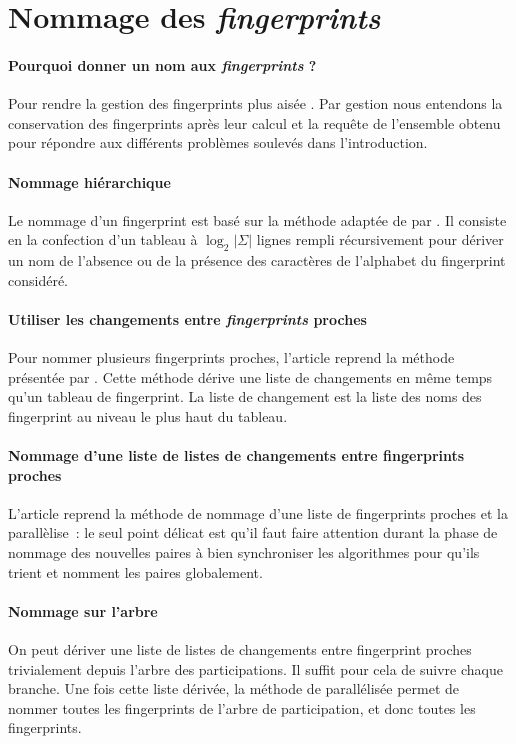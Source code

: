 \documentclass[a4paper]{article}
\begin{document}
\section{Nommage des \emph{fingerprints}}

\paragraph{Pourquoi donner un nom aux \emph{fingerprints} ?} Pour
rendre la gestion des fingerprints plus aisée \cite{amir}. Par
gestion nous entendons la conservation des fingerprints après leur
calcul et la requête de l'ensemble obtenu pour répondre aux différents
problèmes soulevés dans l'introduction.

\paragraph{Nommage hiérarchique} Le nommage d'un fingerprint est basé
sur la méthode adaptée de \cite{karp} par \cite{amir}. Il consiste en
la confection d'un tableau à $\log_2 |\Sigma|$ lignes rempli
récursivement pour dériver un nom de l'absence ou de la présence des
caractères de l'alphabet du fingerprint considéré.

\paragraph{Utiliser les changements entre \emph{fingerprints} proches}
Pour nommer plusieurs fingerprints proches, l'article reprend la
méthode présentée par \cite{tsur}. Cette méthode dérive une liste de
changements en même temps qu'un tableau de fingerprint. La liste de
changement est la liste des noms des fingerprint au niveau le plus
haut du tableau.

\paragraph{Nommage d'une liste de listes de changements entre
  fingerprints proches} L'article reprend la méthode de nommage d'une
liste de fingerprints proches et la parallèlise~: le seul point
délicat est qu'il faut faire attention durant la phase de nommage des
nouvelles paires à bien synchroniser les algorithmes pour qu'ils
trient et nomment les paires globalement.

\paragraph{Nommage sur l'arbre} On peut dériver une liste de listes de
changements entre fingerprint proches trivialement depuis l'arbre des
participations. Il suffit pour cela de suivre chaque branche. Une fois
cette liste dérivée, la méthode de \cite{tsur} parallélisée permet de
nommer toutes les fingerprints de l'arbre de participation, et donc
toutes les fingerprints.
\end{document}
